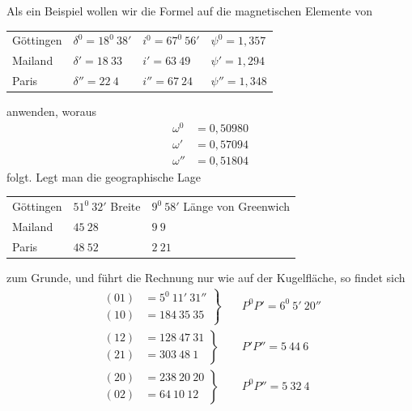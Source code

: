 Als ein Beispiel wollen wir die Formel auf die magnetischen Elemente von
\begin{center}
\begin{tabular}{l|l|l|l}
Göttingen&$\delta^0=18^0\ 38'$&$i^0=67^0\ 56'$&$\psi^0=1{,}357$\\
Mailand&$\delta'=18\ 33$&$i'=63\ 49$&$\psi'=1{,}294$\\
Paris&$\delta''=22\ 4$&$i''=67\ 24$&$\psi''=1{,}348$
\end{tabular}
\end{center}
anwenden, woraus
\[
\begin{aligned}
\omega^0&=0{,}50980\\
\omega'&=0{,}57094\\
\omega''&=0{,}51804
\end{aligned}
\]
folgt. Legt man die geographische Lage
\begin{center}
\begin{tabular}{l|l|l}
Göttingen&$51^0\ 32'$ Breite&$9^0\ 58'$ Länge von Greenwich\\
Mailand&$45\ 28$&$9\ 9$\\
Paris&$48\ 52$&$2\ 21$
\end{tabular}
\end{center}
zum Grunde, und führt die Rechnung nur wie auf der Kugelfläche, so findet sich
\[
\begin{aligned}
\left.\begin{aligned}(01)&=5^0\ 11'\ 31''\\(10)&=184\ 35\ 35\end{aligned}\right\}&\quad P^0P'=6^0\ 5'\ 20''\\[4pt]
\left.\begin{aligned}(12)&=128\ 47\ 31\\(21)&=303\ 48\ 1\end{aligned}\right\}&\quad P'P''=5\ 44\ 6\\[4pt]
\left.\begin{aligned}(20)&=238\ 20\ 20\\(02)&=64\ 10\ 12\end{aligned}\right\}&\quad P^0P''=5\ 32\ 4
\end{aligned}
\]
